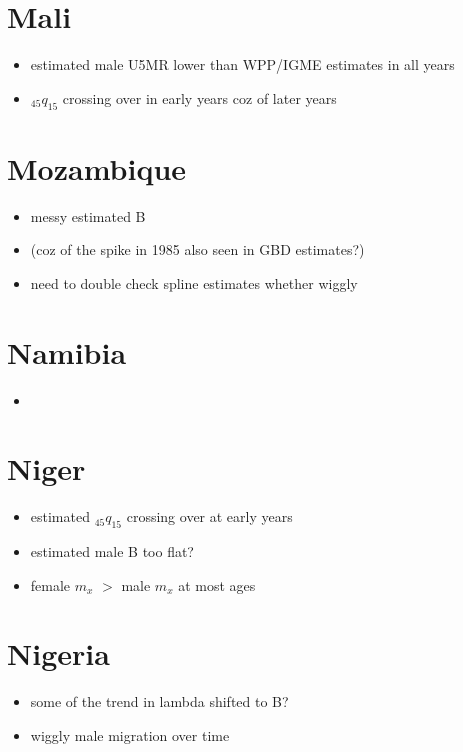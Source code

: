 \documentclass[12pt,a4paper]{article}
\begin{document}
\section*{Mali}
\begin{itemize}
\item estimated male U5MR lower than WPP/IGME estimates in all years
\item $_{45}q_{15}$ crossing over in early years coz of later years
\end{itemize}

\section*{Mozambique}
\begin{itemize}
\item messy estimated B
\item (coz of the spike in 1985 also seen in GBD estimates?)
\item need to double check spline estimates whether wiggly
\end{itemize}

\section*{Namibia}
\begin{itemize}
\item
\end{itemize}

\section*{Niger}
\begin{itemize}
\item estimated $_{45}q_{15}$ crossing over at early years
\item estimated male B too flat?
\item female $m_x$ $>$ male $m_x$ at most ages
\end{itemize}

\section*{Nigeria}
\begin{itemize}
\item some of the trend in lambda shifted to B?
\item wiggly male migration over time
\end{itemize}
\end{document}
